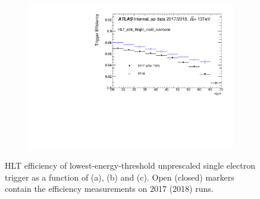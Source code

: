 \begin{figure}[h!tb]
\begin{subfigure}[c]{.48\textwidth}
\end{subfigure} \\
\begin{subfigure}[c]{.48\textwidth}
\centering
\includegraphics[width=\textwidth]{sections/operation/figures/efficiencies/eff_EGAM1_e26_lhtight_nod0_ivarloose_2017_after_ts1_and_2018_mu.pdf}
\caption{}
\end{subfigure}
\caption{\label{fig:primary_triggers_comp_2018}HLT efficiency of
lowest-energy-threshold unprescaled single electron trigger as a function of
\et (a), \eta (b) and \avgmu (c). Open (closed) markers contain the efficiency
measurements on 2017 (2018) runs.}
\end{figure}


